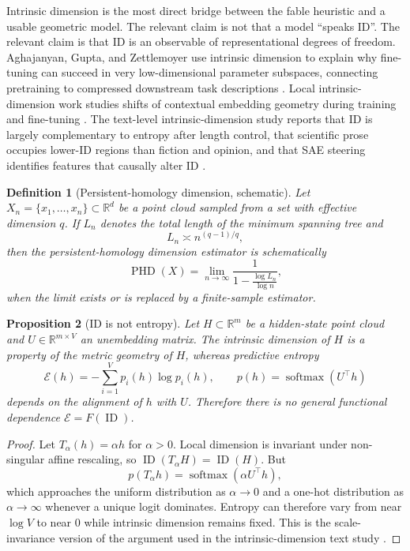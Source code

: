 \documentclass[11pt]{article}
\newtheorem{definition}{Definition}[section]
\newtheorem{proposition}[definition]{Proposition}
\newcommand{\ID}{\operatorname{ID}}
\newcommand{\PHD}{\operatorname{PHD}}
\newcommand{\R}{\mathbb R}
\begin{document}
Intrinsic dimension is the most direct bridge between the fable heuristic and a usable geometric model.  The relevant claim is not that a model ``speaks ID''.  The relevant claim is that ID is an observable of representational degrees of freedom.  Aghajanyan, Gupta, and Zettlemoyer use intrinsic dimension to explain why fine-tuning can succeed in very low-dimensional parameter subspaces, connecting pretraining to compressed downstream task descriptions \cite{Aghajanyan2021}.  Local intrinsic-dimension work studies shifts of contextual embedding geometry during training and fine-tuning \cite{Ruppik2025}.  The text-level intrinsic-dimension study reports that ID is largely complementary to entropy after length control, that scientific prose occupies lower-ID regions than fiction and opinion, and that SAE steering identifies features that causally alter ID \cite{Pedashenko2025}.

\begin{definition}[Persistent-homology dimension, schematic]
Let $X_n=\{x_1,\dots,x_n\}\subset\R^d$ be a point cloud sampled from a set with effective dimension $q$.  If $L_n$ denotes the total length of the minimum spanning tree and
\[
  L_n\asymp n^{(q-1)/q},
\]
then the persistent-homology dimension estimator is schematically
\[
  \PHD(X)=\lim_{n\to\infty}\frac{1}{1-\frac{\log L_n}{\log n}},
\]
when the limit exists or is replaced by a finite-sample estimator.
\end{definition}

\begin{proposition}[ID is not entropy]
Let $H\subset\R^m$ be a hidden-state point cloud and $U\in\R^{m\times V}$ an unembedding matrix.  The intrinsic dimension of $H$ is a property of the metric geometry of $H$, whereas predictive entropy
\[
  \mathcal E(h)=-\sum_{i=1}^V p_i(h)\log p_i(h),\qquad p(h)=\operatorname{softmax}(U^\top h)
\]
depends on the alignment of $h$ with $U$.  Therefore there is no general functional dependence $\mathcal E=F(\ID)$.
\end{proposition}

\begin{proof}
Let $T_\alpha(h)=\alpha h$ for $\alpha>0$.  Local dimension is invariant under non-singular affine rescaling, so $\ID(T_\alpha H)=\ID(H)$.  But
\[
  p(T_\alpha h)=\operatorname{softmax}(\alpha U^\top h),
\]
which approaches the uniform distribution as $\alpha\to0$ and a one-hot distribution as $\alpha\to\infty$ whenever a unique logit dominates.  Entropy can therefore vary from near $\log V$ to near $0$ while intrinsic dimension remains fixed.  This is the scale-invariance version of the argument used in the intrinsic-dimension text study \cite{Pedashenko2025}.
\end{proof}
\end{document}
